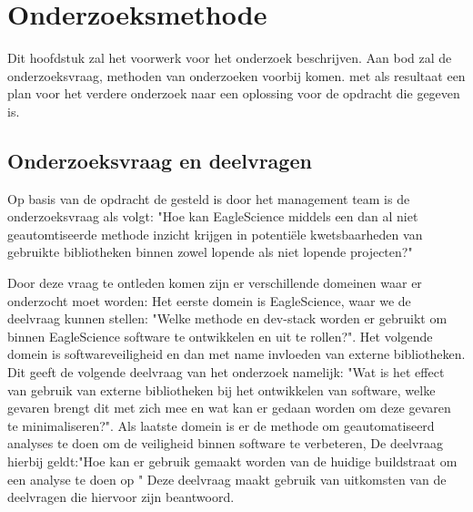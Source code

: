 \chapter{Onderzoeksmethode}\label{ch:onderzoeksmethode}
Dit hoofdstuk zal het voorwerk voor het onderzoek beschrijven. Aan bod zal de onderzoeksvraag, methoden van onderzoeken voorbij komen. met als resultaat een plan voor het verdere onderzoek naar een oplossing voor de opdracht die gegeven is.


\section{Onderzoeksvraag en deelvragen}
Op basis van de opdracht de gesteld is door het management team is de onderzoeksvraag als volgt: "Hoe kan EagleScience middels een dan al niet geautomtiseerde methode inzicht krijgen in potentiële kwetsbaarheden van gebruikte bibliotheken binnen zowel lopende als niet lopende projecten?"

Door deze vraag te ontleden komen zijn er verschillende domeinen waar er onderzocht moet worden:
Het eerste domein is EagleScience, waar we de deelvraag kunnen stellen: "Welke methode en dev-stack worden er gebruikt om binnen EagleScience software te ontwikkelen en uit te rollen?". Het volgende domein is softwareveiligheid en dan met name invloeden van externe bibliotheken. Dit geeft de volgende deelvraag van het onderzoek namelijk: "Wat is het effect van gebruik van externe bibliotheken bij het ontwikkelen van software, welke gevaren brengt dit met zich mee en wat kan er gedaan worden om deze gevaren te minimaliseren?". Als laatste domein is er de methode om geautomatiseerd analyses te doen om de veiligheid binnen software te verbeteren, De deelvraag hierbij geldt:"Hoe kan er gebruik gemaakt worden van de huidige buildstraat om een analyse te doen op " Deze deelvraag maakt gebruik van uitkomsten van de deelvragen die hiervoor zijn beantwoord.

